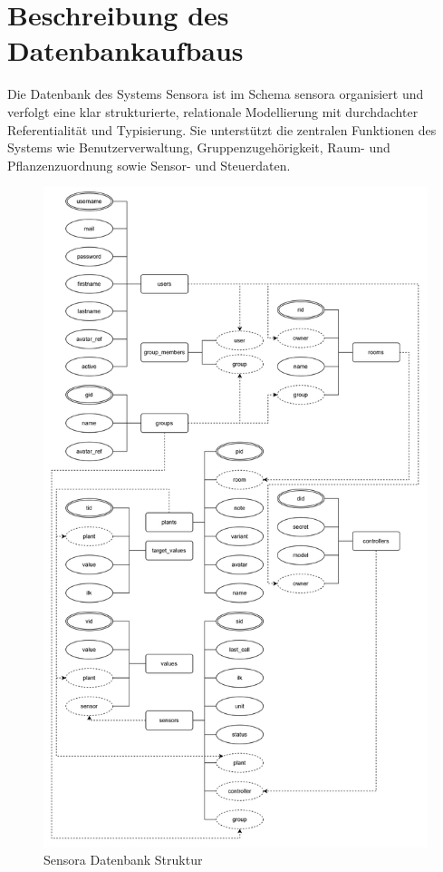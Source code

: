 \section{Beschreibung des Datenbankaufbaus}
Die Datenbank des Systems Sensora ist im Schema sensora organisiert und verfolgt eine klar strukturierte, relationale Modellierung mit durchdachter Referentialität und Typisierung. Sie unterstützt die zentralen Funktionen des Systems wie Benutzerverwaltung, Gruppenzugehörigkeit, Raum- und Pflanzenzuordnung sowie Sensor- und Steuerdaten.

\begin{figure}[h]
\centering
%  
  \includegraphics[width=\linewidth, height=0.9\textheight]{img/Datenbank Diagramm.png}
\caption{Sensora Datenbank Struktur}
\label{fig:sensora_datenbank}
\end{figure}

